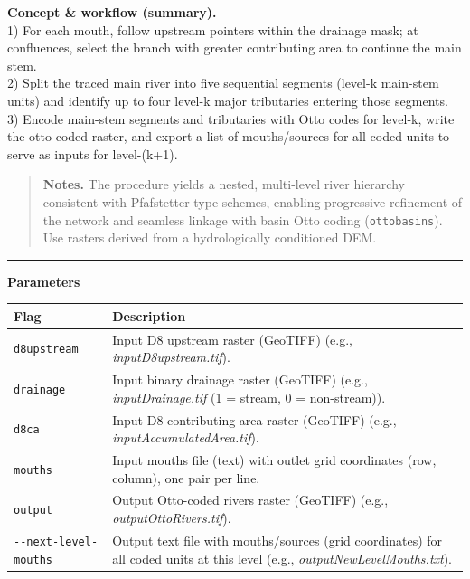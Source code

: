 \documentclass[
]{book}
\begin{document}
\textbf{Concept \& workflow (summary).}\\
1) For each mouth, follow upstream pointers within the drainage mask; at confluences, select the branch with greater contributing area to continue the main stem.\\
2) Split the traced main river into five sequential segments (level-k main-stem units) and identify up to four level-k major tributaries entering those segments.\\
3) Encode main-stem segments and tributaries with Otto codes for level-k, write the otto-coded raster, and export a list of mouths/sources for all coded units to serve as inputs for level-(k+1).

\begin{quote}
\textbf{Notes.} The procedure yields a nested, multi-level river hierarchy consistent with Pfafstetter-type schemes, enabling progressive refinement of the network and seamless linkage with basin Otto coding (\texttt{ottobasins}). Use rasters derived from a hydrologically conditioned DEM.
\end{quote}

\begin{center}\rule{0.5\linewidth}{0.5pt}\end{center}

\textbf{Parameters}

\begin{longtable}[]{@{}
  >{\raggedright\arraybackslash}p{}
  >{\raggedright\arraybackslash}p{}@{}}
\toprule\noalign{}
\begin{minipage}[b]{\linewidth}\raggedright
Flag
\end{minipage} & \begin{minipage}[b]{\linewidth}\raggedright
Description
\end{minipage} \\
\midrule\noalign{}
\endhead
\bottomrule\noalign{}
\endlastfoot
\texttt{d8upstream} & Input D8 upstream raster (GeoTIFF) (e.g., \emph{inputD8upstream.tif}). \\
\texttt{drainage} & Input binary drainage raster (GeoTIFF) (e.g., \emph{inputDrainage.tif} (1 = stream, 0 = non-stream)). \\
\texttt{d8ca} & Input D8 contributing area raster (GeoTIFF) (e.g., \emph{inputAccumulatedArea.tif}). \\
\texttt{mouths} & Input mouths file (text) with outlet grid coordinates (row, column), one pair per line. \\
\texttt{output} & Output Otto-coded rivers raster (GeoTIFF) (e.g., \emph{outputOttoRivers.tif}). \\
\texttt{-\/-next-level-mouths} & Output text file with mouths/sources (grid coordinates) for all coded units at this level (e.g., \emph{outputNewLevelMouths.txt}). \\
\end{longtable}
\end{document}
